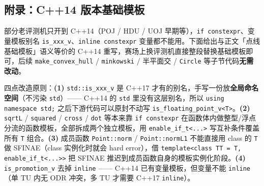 	\newpage

	\subsection{附录：C++14 版本基础模板}

	部分老评测机只开到 C++14（POJ / HDU / UOJ 早期等），\texttt{if constexpr}、变量模板别名 \texttt{is\_xxx\_v}、\texttt{inline constexpr} 变量都不能用。下面给出与正文「点线基础模板」语义等价的 C++14 重写，赛场上换评测机直接整段替换基础模板即可，后续 \texttt{make\_convex\_hull} / \texttt{minkowski} / 半平面交 / \texttt{Circle} 等子节代码\textbf{无需改动}。

	四点改造原则：\textbf{(1)} \texttt{std::is\_xxx\_v} 是 C++17 才有的别名，手写一份放\textbf{全局命名空间}（不污染 \texttt{std}）—— C++14 的 \texttt{std} 里没有这层别名，所以 \texttt{using namespace std;} 之后下游代码可以原封不动写 \texttt{is\_floating\_point\_v<T>}。\textbf{(2)} \texttt{sqrtL} / \texttt{squared} / \texttt{cross} / \texttt{dot} 等本来靠 \texttt{if constexpr} 在函数体内做整型/浮点分流的函数模板，全部拆成两个独立模板，用 \texttt{enable\_if\_t<...>} 写互补条件覆盖所有 \texttt{T} 组合。\textbf{(3)} 成员函数 \texttt{Point::norm} / \texttt{Point::normL1} 不能直接用 class 的 \texttt{T} 做 SFINAE（class 实例化时就会 hard error），借 \texttt{template<class TT = T, enable\_if\_t<...>>} 把 SFINAE 推迟到成员函数自身的模板实例化阶段。\textbf{(4)} \texttt{is\_promotion\_v} 去掉 \texttt{inline} —— C++14 已有变量模板，但变量不能 \texttt{inline}（单 TU 内无 ODR 冲突，多 TU 才需要 C++17 \texttt{inline}）。

